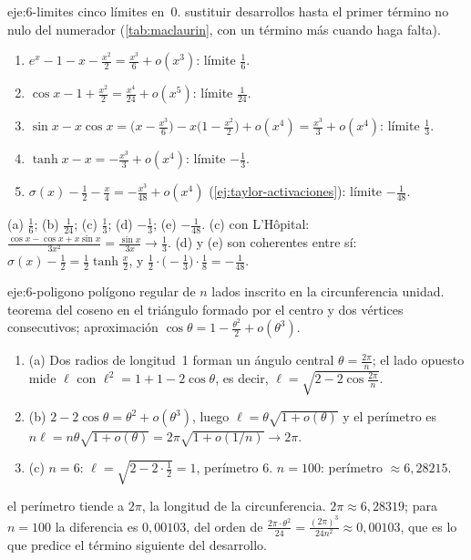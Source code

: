 \begin{solucion}{eje:6-limites}
\datos cinco límites en~0.
\planteamiento sustituir desarrollos hasta el primer término no nulo del numerador (\cref{tab:maclaurin}, con un término más cuando haga falta).
\pasos
\begin{enumerate}[label=(\alph*)]
  \item $e^{x}-1-x-\frac{x^{2}}{2}=\frac{x^{3}}{6}+o(x^{3})$: límite $\frac16$.
  \item $\cos x-1+\frac{x^{2}}{2}=\frac{x^{4}}{24}+o(x^{5})$: límite $\frac{1}{24}$.
  \item $\sin x-x\cos x=\bigl(x-\frac{x^{3}}{6}\bigr)-x\bigl(1-\frac{x^{2}}{2}\bigr)+o(x^{4})=\frac{x^{3}}{3}+o(x^{4})$: límite $\frac13$.
  \item $\tanh x-x=-\frac{x^{3}}{3}+o(x^{4})$: límite $-\frac13$.
  \item $\sigma(x)-\frac12-\frac x4=-\frac{x^{3}}{48}+o(x^{4})$ (\cref{ej:taylor-activaciones}): límite $-\frac{1}{48}$.
\end{enumerate}
\resultado (a) $\frac16$; (b) $\frac{1}{24}$; (c) $\frac13$; (d) $-\frac13$; (e) $-\frac{1}{48}$.
\comprobacion (c) con L'Hôpital: $\frac{\cos x-\cos x+x\sin x}{3x^{2}}=\frac{\sin x}{3x}\to\frac13$. (d) y (e) son coherentes entre sí: $\sigma(x)-\frac12=\frac12\tanh\frac x2$, y $\frac12\cdot\bigl(-\frac13\bigr)\cdot\frac18=-\frac{1}{48}$.
\end{solucion}

\begin{solucion}{eje:6-poligono}
\datos polígono regular de $n$ lados inscrito en la circunferencia unidad.
\planteamiento teorema del coseno en el triángulo formado por el centro y dos vértices consecutivos; aproximación $\cos\theta=1-\frac{\theta^{2}}{2}+o(\theta^{3})$.
\pasos
\begin{enumerate}[label=\arabic*.]
  \item (a) Dos radios de longitud~1 forman un ángulo central $\theta=\frac{2\pi}{n}$; el lado opuesto mide $\ell$ con $\ell^{2}=1+1-2\cos\theta$, es decir, $\ell=\sqrt{2-2\cos\frac{2\pi}{n}}$.
  \item (b) $2-2\cos\theta=\theta^{2}+o(\theta^{3})$, luego $\ell=\theta\sqrt{1+o(\theta)}$ y el perímetro es $n\ell=n\theta\sqrt{1+o(\theta)}=2\pi\sqrt{1+o(1/n)}\to2\pi$.
  \item (c) $n=6$: $\ell=\sqrt{2-2\cdot\frac12}=1$, perímetro $6$. $n=100$: perímetro $\approx6{,}28215$.
\end{enumerate}
\resultado el perímetro tiende a $2\pi$, la longitud de la circunferencia.
\comprobacion $2\pi\approx6{,}28319$; para $n=100$ la diferencia es $0{,}00103$, del orden de $\frac{2\pi\cdot\theta^{2}}{24}=\frac{(2\pi)^{3}}{24n^{2}}\approx0{,}00103$, que es lo que predice el término siguiente del desarrollo.
\end{solucion}

